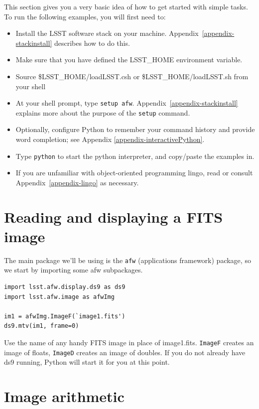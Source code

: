 This section gives you a very basic idea of how to get started with
simple tasks.  To run the following examples, you will first need to:
\begin{itemize} 
\item Install the LSST software stack on your machine.
Appendix~\ref{appendix-stackinstall} describes how to do this.
\item Make sure that you have defined the LSST\_HOME environment
variable.
\item Source \$LSST\_HOME/loadLSST.csh or \$LSST\_HOME/loadLSST.sh
from your shell
\item At your shell prompt, type \texttt{setup
afw}. Appendix~\ref{appendix-stackinstall} explains more about the
purpose of the \texttt{setup} command.
\item Optionally, configure Python to remember
your command history and provide word completion; see
Appendix \ref{appendix-interactivePython}.
\item Type \texttt{python} to start the python interpreter, and copy/paste the examples in.
\item If you are unfamiliar with object-oriented programming lingo,
read or consult Appendix~\ref{appendix-lingo} as necessary.  
\end{itemize} 

\section{Reading and displaying a FITS image}

The main package we'll be using is the \texttt{afw} (applications
framework) package, so we start by importing some afw subpackages.

\begin{verbatim}
import lsst.afw.display.ds9 as ds9
import lsst.afw.image as afwImg

im1 = afwImg.ImageF(`image1.fits')
ds9.mtv(im1, frame=0)
\end{verbatim}

Use the name of any handy FITS image in place of image1.fits.
\texttt{ImageF} creates an image of floats, \texttt{ImageD} creates an
image of doubles.  If you do not already have ds9 running, Python will
start it for you at this point.

\section{Image arithmetic}

